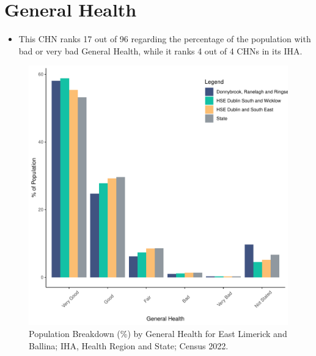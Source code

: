 \documentclass{article}
\begin{document}
\pagebreak

\section{General Health}\label{sect:GenHealth}
\begin{itemize}
\item  This CHN ranks  17 out of 96 regarding the percentage of the population with bad or very bad General Health, while it ranks   4 out of 4 CHNs in its IHA.
\end{itemize}
\begin{figure}[h]
	\centering
	\includegraphics[width = 150mm]{../figures/GenED.pdf}
	\caption{Population Breakdown (\%) by General Health for East Limerick and Ballina; IHA, Health Region and State;  Census 2022.}
	\label{fig:2ae19629-1a6a-13a3-e055-000000000001}
	\end{figure}
\end{document}

